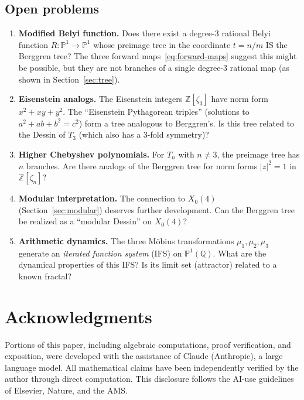 \documentclass[12pt]{amsart}
\theoremstyle{definition}
\theoremstyle{remark}
\newcommand{\ZZ}{\mathbb{Z}}
\newcommand{\QQ}{\mathbb{Q}}
\newcommand{\PP}{\mathbb{P}}
\begin{document}
\subsection{Open problems}

\begin{enumerate}
  \item \textbf{Modified Belyi function.}
    Does there exist a degree-3 rational Belyi function $R\colon\PP^1
    \to\PP^1$ whose preimage tree in the coordinate $t=n/m$ IS the
    Berggren tree?  The three forward maps~\eqref{eq:forward-maps}
    suggest this might be possible, but they are not branches of a
    single degree-3 rational map (as shown in Section~\ref{sec:tree}).

  \item \textbf{Eisenstein analogs.}
    The Eisenstein integers $\ZZ[\zeta_3]$ have norm form
    $x^2+xy+y^2$.  The ``Eisenstein Pythagorean triples'' (solutions to
    $a^2+ab+b^2=c^2$) form a tree analogous to Berggren's.  Is this tree
    related to the Dessin of $T_3$ (which also has a 3-fold symmetry)?

  \item \textbf{Higher Chebyshev polynomials.}
    For $T_n$ with $n\ne 3$, the preimage tree has $n$ branches.
    Are there analogs of the Berggren tree for norm forms
    $|z|^2=1$ in $\ZZ[\zeta_n]$?

  \item \textbf{Modular interpretation.}
    The connection to $X_0(4)$ (Section~\ref{sec:modular}) deserves
    further development.  Can the Berggren tree be realized as a
    ``modular Dessin'' on $X_0(4)$?

  \item \textbf{Arithmetic dynamics.}
    The three M\"obius transformations $\mu_1,\mu_2,\mu_3$ generate
    an \emph{iterated function system} (IFS) on $\PP^1(\QQ)$.  What
    are the dynamical properties of this IFS?  Is its limit set
    (attractor) related to a known fractal?
\end{enumerate}


\section*{Acknowledgments}

Portions of this paper, including algebraic computations, proof
verification, and exposition, were developed with the assistance of
Claude (Anthropic), a large language model.  All mathematical claims
have been independently verified by the author through direct
computation.  This disclosure follows the AI-use guidelines of
Elsevier, Nature, and the AMS.
\end{document}
